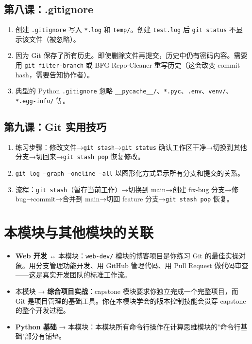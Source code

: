 \documentclass[a4paper,12pt]{ctexart}
\begin{document}
\subsection*{第八课：.gitignore}
\begin{enumerate}
  \item 创建 \texttt{.gitignore} 写入 \texttt{*.log} 和 \texttt{temp/}。创建 \texttt{test.log} 后 \texttt{git status} 不显示该文件（被忽略）。
  \item 因为 Git 保存了所有历史。即使删除文件再提交，历史中仍有密码内容。需要用 \texttt{git filter-branch} 或 BFG Repo-Cleaner 重写历史（这会改变 commit hash，需要告知协作者）。
  \item 典型的 Python \texttt{.gitignore} 忽略 \texttt{\_\_pycache\_\_/}、\texttt{*.pyc}、\texttt{.env}、\texttt{venv/}、\texttt{*.egg-info/} 等。
\end{enumerate}

\subsection*{第九课：Git 实用技巧}
\begin{enumerate}
  \item 练习步骤：修改文件→\texttt{git stash}→\texttt{git status} 确认工作区干净→切换到其他分支→切回来→\texttt{git stash pop} 恢复修改。
  \item \texttt{git log --graph --oneline --all} 以图形化方式显示所有分支和提交的关系。
  \item 流程：\texttt{git stash}（暂存当前工作）→切换到 main→创建 fix-bug 分支→修 bug→commit→合并到 main→切回 feature 分支→\texttt{git stash pop} 恢复。
\end{enumerate}

\section*{本模块与其他模块的关联}

\begin{itemize}
  \item \textbf{Web 开发} ↔ 本模块：\texttt{web-dev/} 模块的博客项目是你练习 Git 的最佳实操对象。用分支管理功能开发、用 GitHub 管理代码、用 Pull Request 做代码审查——这是真实开发团队的标准工作流。
  \item 本模块 → \textbf{综合项目实战}：capstone 模块要求你独立完成一个完整项目，而 Git 是项目管理的基础工具。你在本模块学会的版本控制技能会贯穿 capstone 的整个开发过程。
  \item \textbf{Python 基础} → 本模块：本模块所有命令行操作在计算思维模块的"命令⾏基础"部分有铺垫。
\end{itemize}
\end{document}
